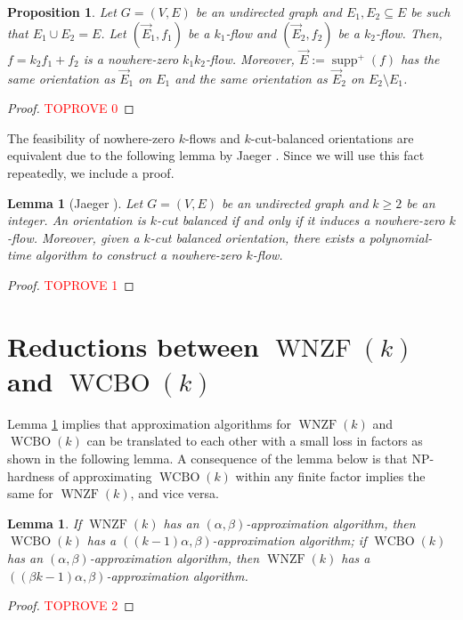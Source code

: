 \documentclass[11pt]{article}
\newtheorem{lemma}[theorem]{Lemma}
\newtheorem{prop}[theorem]{Proposition}
\DeclareMathOperator{\supp}{supp}
\begin{document}
\begin{prop}\label{prop:sum-flows}
    Let $G=(V,E)$ be an undirected graph and $E_1,E_2\subseteq E$ be such that $E_1\cup E_2=E$. Let $(\vec{E}_1,f_1)$ be a $k_1$-flow and $(\vec{E}_2,f_2)$ be a $k_2$-flow. Then, $f=k_2f_1+f_2$ is a nowhere-zero $k_1k_2$-flow. Moreover, $\vec{E}:=\supp^+(f)$ has the same orientation as $\vec{E}_1$ on $E_1$ and the same orientation as $\vec{E}_2$ on $E_2\setminus E_1$.
\end{prop}
\begin{proof}\textcolor{red}{TOPROVE 0}\end{proof}

The feasibility of nowhere-zero $k$-flows and $k$-cut-balanced orientations are equivalent due to the following lemma by Jaeger \cite{jaeger1976balanced}. Since we will use this fact repeatedly, we include a proof.
\begin{lemma}[Jaeger \cite{jaeger1976balanced}]\label{lemma:equivalence}
Let $G=(V, E)$ be an undirected graph and $k\ge 2$ be an integer. An orientation is $k$-cut balanced if and only if it induces a nowhere-zero $k$-flow. Moreover, given a $k$-cut balanced orientation, there exists a polynomial-time algorithm to construct a nowhere-zero $k$-flow.
\end{lemma}
\begin{proof}\textcolor{red}{TOPROVE 1}\end{proof}

\section{Reductions between $\operatorname{WNZF}(k)$ and $\operatorname{WCBO}(k)$}\label{sec:reduction}
Lemma \ref{lemma:equivalence} implies that approximation algorithms for $\operatorname{WNZF}(k)$ and $\operatorname{WCBO}(k)$ can be translated to each other with a small loss in factors as shown in the following lemma. A consequence of the lemma below is that NP-hardness of approximating $\operatorname{WCBO}(k)$ within any finite factor implies the same for $\operatorname{WNZF}(k)$, and vice versa.
\begin{lemma}\label{lemma:approx_translate}
    If $\operatorname{WNZF}(k)$ has an $(\alpha,\beta)$-approximation algorithm, then $\operatorname{WCBO}(k)$ has a $((k-1)\alpha,\beta)$-approximation algorithm; if $\operatorname{WCBO}(k)$ has an $(\alpha,\beta)$-approximation algorithm, then $\operatorname{WNZF}(k)$ has a $((\beta k-1)\alpha,\beta)$-approximation algorithm.
\end{lemma}
\begin{proof}\textcolor{red}{TOPROVE 2}\end{proof}
\end{document}
